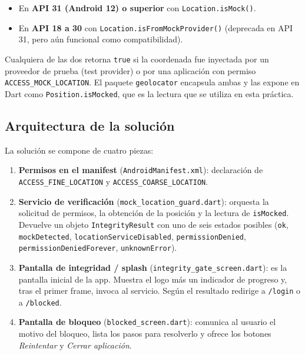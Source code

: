 \documentclass[12pt, a4paper]{article}
\begin{document}
\begin{itemize}
    \item En \textbf{API 31 (Android 12) o superior} con
    \texttt{Location.isMock()}.
    \item En \textbf{API 18 a 30} con
    \texttt{Location.isFromMockProvider()} (deprecada en API 31, pero
    aún funcional como compatibilidad).
\end{itemize}

Cualquiera de las dos retorna \texttt{true} si la coordenada fue
inyectada por un proveedor de prueba (test provider) o por una
aplicación con permiso \texttt{ACCESS\_MOCK\_LOCATION}. El paquete
\texttt{geolocator} encapsula ambas y las expone en Dart como
\texttt{Position.isMocked}, que es la lectura que se utiliza en esta
práctica.

\subsection{Arquitectura de la solución}
La solución se compone de cuatro piezas:

\begin{enumerate}
    \item \textbf{Permisos en el manifest}
    (\texttt{AndroidManifest.xml}): declaración de
    \texttt{ACCESS\_FINE\_LOCATION} y \texttt{ACCESS\_COARSE\_LOCATION}.
    \item \textbf{Servicio de verificación}
    (\texttt{mock\_location\_guard.dart}): orquesta la solicitud de
    permisos, la obtención de la posición y la lectura de
    \texttt{isMocked}. Devuelve un objeto \texttt{IntegrityResult} con
    uno de seis estados posibles (\texttt{ok}, \texttt{mockDetected},
    \texttt{locationServiceDisabled}, \texttt{permissionDenied},
    \texttt{permissionDeniedForever}, \texttt{unknownError}).
    \item \textbf{Pantalla de integridad / splash}
    (\texttt{integrity\_gate\_screen.dart}): es la pantalla inicial de
    la app. Muestra el logo más un indicador de progreso y, tras el
    primer frame, invoca al servicio. Según el resultado redirige a
    \texttt{/login} o a \texttt{/blocked}.
    \item \textbf{Pantalla de bloqueo}
    (\texttt{blocked\_screen.dart}): comunica al usuario el motivo
    del bloqueo, lista los pasos para resolverlo y ofrece los botones
    \textit{Reintentar} y \textit{Cerrar aplicación}.
\end{enumerate}
\end{document}
